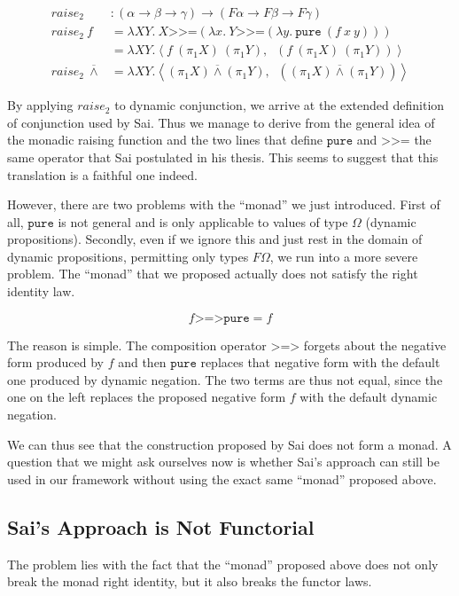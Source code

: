 \documentclass[a4paper,11pt,DIV=12]{scrartcl}
\newcommand{\dand}{\mathbin{\overline{\land}}}
\newcommand{\dnot}{\mathop{\overline{\lnot}}}
\newcommand{\hsbind}{\mathbin{\texttt{>>=}}}
\newcommand{\hscomp}{\mathbin{\texttt{>=>}}}
\begin{document}
\begin{align*}
  raise_2 &: (\alpha \to \beta \to \gamma) \to (F \alpha \to F \beta \to F
  \gamma) \\
  raise_2\ f &= \lambda X Y.\ X \hsbind (\lambda x.\ Y \hsbind (\lambda
  y.\ \texttt{pure}\ (f\ x\ y))) \\
            &= \lambda X Y. \left< f\ (\pi_1 X)\ (\pi_1 Y), \dnot
  (f\ (\pi_1 X)\ (\pi_1 Y)) \right> \\
  raise_2\ \dand &= \lambda X Y. \left< (\pi_1X) \dand (\pi_1Y), \dnot
  ((\pi_1 X) \dand (\pi_1 Y)) \right>
\end{align*}

By applying $raise_2$ to dynamic conjunction, we arrive at the extended
definition of conjunction used by Sai. Thus we manage to derive from the
general idea of the monadic raising function and the two lines that define
$\texttt{pure}$ and $\hsbind$ the same operator that Sai postulated in his
thesis. This seems to suggest that this translation is a faithful one
indeed.

However, there are two problems with the ``monad'' we just
introduced. First of all, $\texttt{pure}$ is not general and is only
applicable to values of type $\Omega$ (dynamic propositions). Secondly,
even if we ignore this and just rest in the domain of dynamic propositions,
permitting only types $F \Omega$, we run into a more severe problem. The
``monad'' that we proposed actually does not satisfy the right identity
law.

$$
f \hscomp \texttt{pure} = f
$$
 
The reason is simple. The composition operator $\hscomp$ forgets about the
negative form produced by $f$ and then $\texttt{pure}$ replaces that
negative form with the default one produced by dynamic negation. The two
terms are thus not equal, since the one on the left replaces the proposed
negative form $f$ with the default dynamic negation.

We can thus see that the construction proposed by Sai does not form a
monad. A question that we might ask ourselves now is whether Sai's approach
can still be used in our framework without using the exact same ``monad''
proposed above.

\subsection{Sai's Approach is Not Functorial}

The problem lies with the fact that the ``monad'' proposed above does not
only break the monad right identity, but it also breaks the functor laws.
\end{document}
